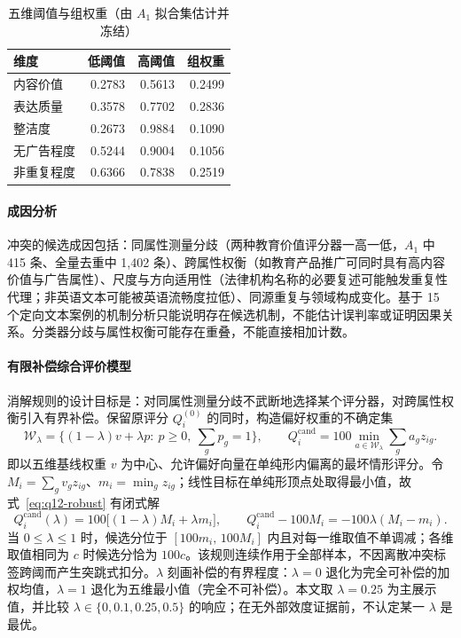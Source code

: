 \begin{table}[htbp]
  \centering
  \caption{五维阈值与组权重（由 $A_1$ 拟合集估计并冻结）}
  \label{tab:q1-conflict-thresholds}
  \renewcommand{\arraystretch}{1.15}
  \begin{tabular}{lrrr}
    \toprule
    维度 & 低阈值 & 高阈值 & 组权重 \\
    \midrule
    内容价值 & 0.2783 & 0.5613 & 0.2499 \\
    表达质量 & 0.3578 & 0.7702 & 0.2836 \\
    整洁度 & 0.2673 & 0.9884 & 0.1090 \\
    无广告程度 & 0.5244 & 0.9004 & 0.1056 \\
    非重复程度 & 0.6366 & 0.7838 & 0.2519 \\
    \bottomrule
  \end{tabular}
\end{table}

\paragraph{成因分析}
冲突的候选成因包括：同属性测量分歧（两种教育价值评分器一高一低，$A_1$ 中 415 条、全量去重中 1,402 条）、跨属性权衡（如教育产品推广可同时具有高内容价值与广告属性）、尺度与方向适用性（法律机构名称的必要复述可能触发重复性代理；非英语文本可能被英语流畅度拉低）、同源重复与领域构成变化。基于 15 个定向文本案例的机制分析只能说明存在候选机制，不能估计误判率或证明因果关系。分类器分歧与属性权衡可能存在重叠，不能直接相加计数。

\paragraph{有限补偿综合评价模型}
消解规则的设计目标是：对同属性测量分歧不武断地选择某个评分器，对跨属性权衡引入有界补偿。保留原评分 $Q_i^{(0)}$ 的同时，构造偏好权重的不确定集
\begin{equation}
\mathcal{W}_\lambda=\{(1-\lambda)v+\lambda p:\ p\ge0,\ \textstyle\sum_g p_g=1\},\qquad
Q_i^{\mathrm{cand}}=100\min_{a\in\mathcal{W}_\lambda}\sum_g a_gz_{ig}.
\label{eq:q12-robust}
\end{equation}
即以五维基线权重 $v$ 为中心、允许偏好向量在单纯形内偏离的最坏情形评分。令 $M_i=\sum_gv_gz_{ig}$、$m_i=\min_gz_{ig}$；线性目标在单纯形顶点处取得最小值，故式~\eqref{eq:q12-robust} 有闭式解
\begin{equation}
Q_i^{\mathrm{cand}}(\lambda)=100\big[(1-\lambda)M_i+\lambda m_i\big],\qquad
Q_i^{\mathrm{cand}}-100M_i=-100\lambda(M_i-m_i).
\label{eq:q12-closed}
\end{equation}
当 $0\le\lambda\le1$ 时，候选分位于 $[100m_i,\,100M_i]$ 内且对每一维取值不单调减；各维取值相同为 $c$ 时候选分恰为 $100c$。该规则连续作用于全部样本，不因离散冲突标签跨阈而产生突跳式扣分。$\lambda$ 刻画补偿的有界程度：$\lambda=0$ 退化为完全可补偿的加权均值，$\lambda=1$ 退化为五维最小值（完全不可补偿）。本文取 $\lambda=0.25$ 为主展示值，并比较 $\lambda\in\{0,0.1,0.25,0.5\}$ 的响应；在无外部效度证据前，不认定某一 $\lambda$ 是最优。

